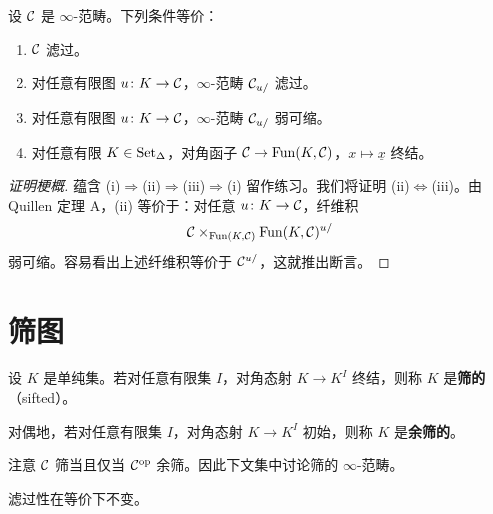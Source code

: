 \begin{proposition}\label{L10-3.10}
设 $\mathcal{C}$ 是 $\infty$-范畴。下列条件等价：
\begin{enumerate}[label=(\roman*),leftmargin=2.4em,itemsep=0.1em]
\item $\mathcal{C}$ 滤过。
\item 对任意有限图 $u\colon K\to\mathcal{C}$，$\infty$-范畴 $\mathcal{C}_{u/}$ 滤过。
\item 对任意有限图 $u\colon K\to\mathcal{C}$，$\infty$-范畴 $\mathcal{C}_{u/}$ 弱可缩。
\item 对任意有限 $K\in\operatorname{Set}_\Delta$，对角函子 $\mathcal{C}\to\operatorname{Fun}(K,\mathcal{C})$，$x\mapsto\underline{x}$ 终结。
\end{enumerate}
\end{proposition}

\begin{proof}[证明梗概]
蕴含 (i)$\Rightarrow$(ii)$\Rightarrow$(iii)$\Rightarrow$(i) 留作练习。我们将证明 (ii)$\Leftrightarrow$(iii)。由 Quillen 定理 A，(ii) 等价于：对任意 $u\colon K\to\mathcal{C}$，纤维积
\[
\mathcal{C}\times_{\operatorname{Fun}(K,\mathcal{C})}\operatorname{Fun}(K,\mathcal{C})^{u/}
\]
弱可缩。容易看出上述纤维积等价于 $\mathcal{C}^{u/}$，这就推出断言。
\end{proof}

\section{筛图}

\begin{definition}\label{L10-4.1}
设 $K$ 是单纯集。若对任意有限集 $I$，对角态射 $K\to K^I$ 终结，则称 $K$ 是\textbf{筛的}（sifted）。

对偶地，若对任意有限集 $I$，对角态射 $K\to K^I$ 初始，则称 $K$ 是\textbf{余筛的}。
\end{definition}


\nitem\label{L10-4.2} 注意 $\mathcal{C}$ 筛当且仅当 $\mathcal{C}^{\mathrm{op}}$ 余筛。因此下文集中讨论筛的 $\infty$-范畴。

\begin{exercise}\label{L10-4.3}
滤过性在等价下不变。
\end{exercise}


